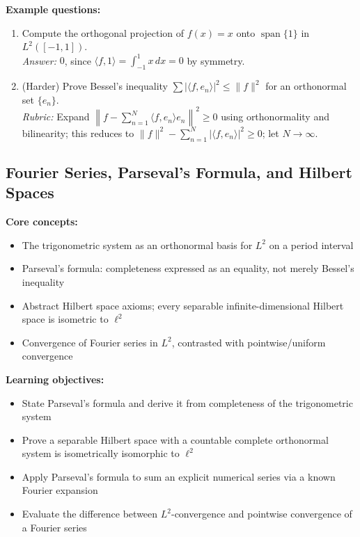 \documentclass[11pt]{article}
\begin{document}
\textbf{Example questions:}
\begin{enumerate}[nosep]
\item Compute the orthogonal projection of $f(x)=x$ onto $\operatorname{span}\{1\}$ in $L^2([-1,1])$. \\
\textit{Answer:} $0$, since $\langle f,1\rangle=\int_{-1}^1 x\,dx=0$ by symmetry.
\item (Harder) Prove Bessel's inequality $\sum|\langle f,e_n\rangle|^2\le\|f\|^2$ for an orthonormal set $\{e_n\}$. \\
\textit{Rubric:} Expand $\left\|f-\sum_{n=1}^N\langle f,e_n\rangle e_n\right\|^2\ge0$ using orthonormality and bilinearity; this reduces to $\|f\|^2-\sum_{n=1}^N|\langle f,e_n\rangle|^2\ge0$; let $N\to\infty$.
\end{enumerate}

\subsection{Fourier Series, Parseval's Formula, and Hilbert Spaces}

\textbf{Core concepts:}
\begin{itemize}[nosep]
\item The trigonometric system as an orthonormal basis for $L^2$ on a period interval
\item Parseval's formula: completeness expressed as an equality, not merely Bessel's inequality
\item Abstract Hilbert space axioms; every separable infinite-dimensional Hilbert space is isometric to $\ell^2$
\item Convergence of Fourier series in $L^2$, contrasted with pointwise/uniform convergence
\end{itemize}

\textbf{Learning objectives:}
\begin{itemize}[nosep]
\item State Parseval's formula and derive it from completeness of the trigonometric system
\item Prove a separable Hilbert space with a countable complete orthonormal system is isometrically isomorphic to $\ell^2$
\item Apply Parseval's formula to sum an explicit numerical series via a known Fourier expansion
\item Evaluate the difference between $L^2$-convergence and pointwise convergence of a Fourier series
\end{itemize}
\end{document}
